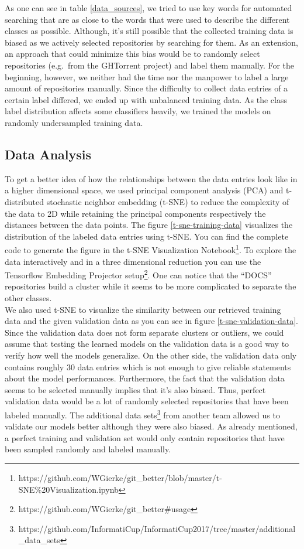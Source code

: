 \documentclass[%
a4paper,
DIV12,
2.5headlines,
bigheadings,
titlepage,
openbib,
]{scrartcl}
\begin{document}
As one can see in table \ref{data_sources}, we tried to use key words for automated searching that are as close to the words that were used to describe the different classes as possible.
Although, it's still possible that the collected training data is biased as we actively selected repositories by searching for them.
As an extension, an approach that could minimize this bias would be to randomly select repositories (e.g.~from the GHTorrent project) and label them manually.
For the beginning, however, we neither had the time nor the manpower to label a large amount of repositories manually.
Since the difficulty to collect data entries of a certain label differed, we ended up with unbalanced training data.
As the class label distribution affects some classifiers heavily, we trained the models on randomly undersampled training data.

\subsection{Data Analysis}\label{data-analysis}

To get a better idea of how the relationships between the data entries look like in a higher dimensional space, we used principal component
analysis (PCA) and t-distributed stochastic neighbor embedding (t-SNE) to reduce the complexity of the data to 2D while retaining the principal
components respectively the distances between the data points.
The figure \ref{t-sne-training-data} visualizes the distribution of the labeled data entries using t-SNE.
You can find the complete code to generate the figure in the t-SNE Visualization Notebook\footnote{https://github.com/WGierke/git\_better/blob/master/t-SNE\%20Visualization.ipynb}.
To explore the data interactively and in a three dimensional reduction you can use the Tensorflow Embedding Projector setup\footnote{https://github.com/WGierke/git\_better\#usage}.
One can notice that the ``DOCS'' repositories build a cluster while it seems to be more complicated to separate the other classes.\\
We also used t-SNE to visualize the similarity between our retrieved training data and the given validation data as you can see in figure \ref{t-sne-validation-data}.
Since the validation data does not form separate clusters or outliers, we could assume that testing the learned models on the validation data
is a good way to verify how well the models generalize.
On the other side, the validation data only contains roughly 30 data entries which is not enough to give reliable statements about the model performances.
Furthermore, the fact that the validation data seems to be selected manually implies that it's also biased.
Thus, perfect validation data would be a lot of randomly selected repositories that have been labeled manually.
The additional data sets\footnote{https://github.com/InformatiCup/InformatiCup2017/tree/master/additional\_data\_sets} from another team allowed us to validate our models better although they were also biased.
As already mentioned, a perfect training and validation set would only contain repositories that have been sampled randomly and labeled manually.
\end{document}
